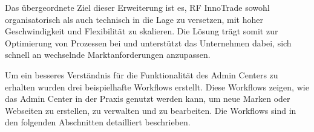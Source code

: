 Das übergeordnete Ziel dieser Erweiterung ist es, RF InnoTrade sowohl organisatorisch als auch technisch in die Lage zu versetzen, mit hoher Geschwindigkeit und Flexibilität zu skalieren. Die Lösung trägt somit zur Optimierung von Prozessen bei und unterstützt das Unternehmen dabei, sich schnell an wechselnde Marktanforderungen anzupassen.

Um ein besseres Verständnis für die Funktionalität des Admin Centers zu erhalten wurden drei beispielhafte Workflows erstellt. Diese Workflows zeigen, wie das Admin Center in der Praxis genutzt werden kann, um neue Marken oder Webseiten zu erstellen, zu verwalten und zu bearbeiten. Die Workflows sind in den folgenden Abschnitten detailliert beschrieben.